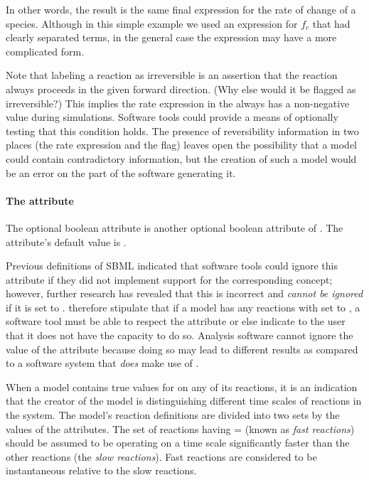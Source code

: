 In other words, the result is the same final expression for the
rate of change of a species.  Although in this simple example we
used an expression for $f_c$ that had clearly separated terms, in
the general case the expression may have a more complicated form.

Note that labeling a reaction as irreversible is an assertion that
the reaction always proceeds in the given forward direction.  (Why
else would it be flagged as irreversible?)  This implies the rate
expression in the \KineticLaw always has a non-negative value
during simulations.  Software tools could provide a means of
optionally testing that this condition holds.  The presence of
reversibility information in two places (\ie the rate expression
and the  flag) leaves open the possibility that
a model could contain contradictory information, but the creation
of such a model would be an error on the part of the software
generating it.


\paragraph{The  attribute}
\label{sec:fast}

The optional boolean attribute  is another optional
boolean attribute of \Reaction.  The attribute's
default value is .

Previous definitions of SBML indicated that software tools could
ignore this attribute if they did not implement support for the
corresponding concept; however, further research has revealed that
this is incorrect and  \emph{cannot be ignored} if it
is set to .  \sbmltwothree {} therefore stipulate that if a
model has any reactions with  set to , a
software tool must be able to respect the attribute or else indicate
to the user that it does not have the capacity to do so.  Analysis
software cannot ignore the value of the  attribute
because doing so may lead to different results as compared to a
software system that \emph{does} make use of .

When a model contains true values for  on any of its
reactions, it is an indication that the creator of the model is
distinguishing different time scales of reactions in the system.
The model's reaction definitions are divided into two sets by the
values of the  attributes.  The set of reactions having
= (known as \emph{fast reactions}) should be
assumed to be operating on a time scale significantly faster than
the other reactions (the \emph{slow reactions}).  Fast reactions
are considered to be instantaneous relative to the slow reactions.

